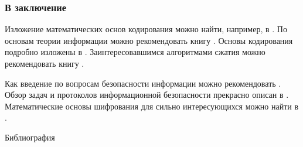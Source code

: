 \appendix


\begin{frame}
    \frametitle{В заключение}
    
    Изложение  математических основ кодирования можно найти, например, в \cite{bib:novic:discrmathprogrammer,bib:yablonsky:discreteintro}. По основам теории информации можно рекомендовать книгу \cite{bib:panin:informationTheory}. Основы кодирования подробно изложены в \cite{bib:verner:codingBase}. Заинтересовавшимся алгоритмами сжатия можно рекомендовать книгу \cite{bib:salmon:compressing}.
    
    Как введение по вопросам безопасности информации можно рекомендовать \cite{bib:tannen:os}. Обзор задач и протоколов информационной безопасности прекрасно описан в \cite{bib:shneir:applCrypto}. Математические основы шифрования для сильно интересующихся можно найти в \cite{bib:shneir:applCrypto, bib:smart:crypto, bib:mao:modernCrypto}.
\end{frame}

\begin{frame}[allowframebreaks]{Библиография}
    
    
\end{frame}

